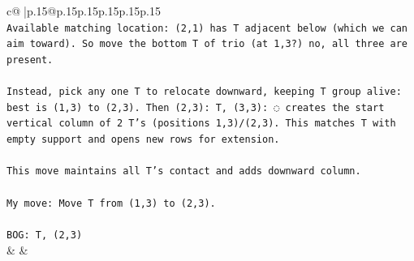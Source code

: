\documentclass{article}
\begin{document}
{\begin{supertabular}{c@{$\;$}|p{.15\linewidth}@{}p{.15\linewidth}p{.15\linewidth}p{.15\linewidth}p{.15\linewidth}p{.15\linewidth}}
{{{\\ 
\texttt{Available matching location: (2,1) has T adjacent below (which we can aim toward). So move the bottom T of trio (at 1,3?) no, all three are present.} \\
\\ 
\texttt{Instead, pick any one T to relocate downward, keeping T group alive: best is (1,3) to (2,3). Then (2,3): T, (3,3): ◌ creates the start vertical column of 2 T's (positions 1,3)/(2,3). This matches T with empty support and opens new rows for extension.} \\
\\ 
\texttt{This move maintains all T's contact and adds downward column.} \\
\\ 
\texttt{My move: Move T from (1,3) to (2,3).} \\
\\ 
\texttt{BOG: T, (2,3)} \\
            }
        }
    }
    & & \\ \\


\end{supertabular}}
\end{document}
